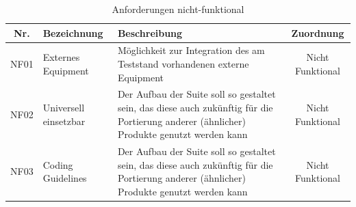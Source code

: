 \begin{table}[h]

\begin{center}

\begin{tabularx}{\textwidth}{|c|X|X|c|}

\hline
Nr. & Bezeichnung & Beschreibung & Zuordnung \\
\hline
NF01 & Externes Equipment & Möglichkeit zur Integration des am Teststand vorhandenen externe Equipment & Nicht Funktional \\
\hline
NF02 & Universell einsetzbar & Der Aufbau der Suite soll so gestaltet sein, das diese auch zukünftig für die Portierung anderer (ähnlicher) Produkte genutzt werden kann & Nicht Funktional \\
\hline
NF03 & Coding Guidelines & Der Aufbau der Suite soll so gestaltet sein, das diese auch zukünftig für die Portierung anderer (ähnlicher) Produkte genutzt werden kann & Nicht Funktional \\
\hline


\end{tabularx}
\caption{Anforderungen nicht-funktional \label{tab:Anforderungstabelle2}}
\end{center}
\end{table}
\cleardoublepage

